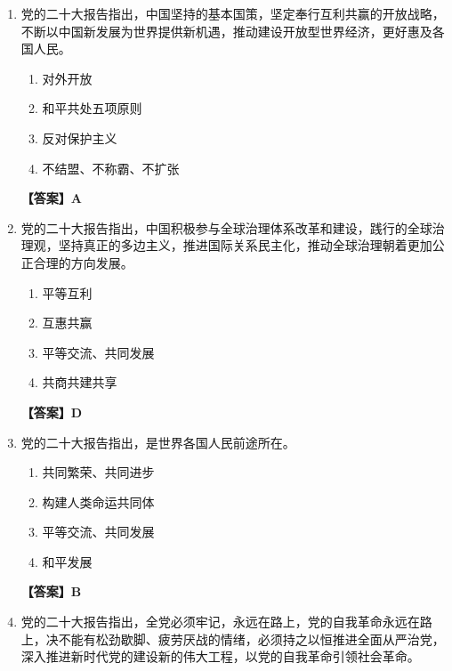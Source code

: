 \documentclass[UTF8,11pt,a4paper]{ctexart}
\begin{document}
\begin{enumerate}[label=\textbf{\arabic*.}, leftmargin=2.5em, itemsep=0.7em]
\begin{enumerate}[label=\Alph*., leftmargin=2em, itemsep=0.1em, topsep=0.15em]
\item 和平共处五项原则
\item 经济互惠互利
\item 平等共处
\item 与邻为善、以邻为伴
\end{enumerate}
\textbf{【答案】A}
\item 党的二十大报告指出，中国坚持\allowbreak\underline{\hspace{4em}}的基本国策，坚定奉行互利共赢的开放战略，不断以中国新发展为世界提供新机遇，推动建设开放型世界经济，更好惠及各国人民。
\begin{enumerate}[label=\Alph*., leftmargin=2em, itemsep=0.1em, topsep=0.15em]
\item 对外开放
\item 和平共处五项原则
\item 反对保护主义
\item 不结盟、不称霸、不扩张
\end{enumerate}
\textbf{【答案】A}
\item 党的二十大报告指出，中国积极参与全球治理体系改革和建设，践行\allowbreak\underline{\hspace{4em}}的全球治理观，坚持真正的多边主义，推进国际关系民主化，推动全球治理朝着更加公正合理的方向发展。
\begin{enumerate}[label=\Alph*., leftmargin=2em, itemsep=0.1em, topsep=0.15em]
\item 平等互利
\item 互惠共赢
\item 平等交流、共同发展
\item 共商共建共享
\end{enumerate}
\textbf{【答案】D}
\item 党的二十大报告指出，\allowbreak\underline{\hspace{4em}}是世界各国人民前途所在。
\begin{enumerate}[label=\Alph*., leftmargin=2em, itemsep=0.1em, topsep=0.15em]
\item 共同繁荣、共同进步
\item 构建人类命运共同体
\item 平等交流、共同发展
\item 和平发展
\end{enumerate}
\textbf{【答案】B}
\item 党的二十大报告指出，全党必须牢记，\allowbreak\underline{\hspace{4em}}永远在路上，党的自我革命永远在路上，决不能有松劲歇脚、疲劳厌战的情绪，必须持之以恒推进全面从严治党，深入推进新时代党的建设新的伟大工程，以党的自我革命引领社会革命。

\end{enumerate}
\end{document}
